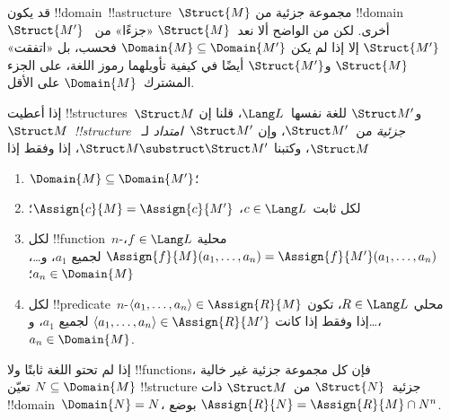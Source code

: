 \documentclass[../../../include/open-logic-section]{subfiles}
\begin{document}

قد يكون !!{domain}~!!a{structure}~$\Struct{M}$ مجموعة جزئية من
!!{domain}~$\Struct{M'}$ أخرى. لكن من الواضح ألا نعد~$\Struct{M}$
«جزءًا» من~$\Struct{M'}$ إلا إذا لم يكن $\Domain{M} \subseteq
\Domain{M'}$ فحسب، بل «اتفقت» $\Struct{M}$ و$\Struct{M'}$ أيضًا في
كيفية تأويلهما رموز اللغة، على الجزء المشترك~$\Domain{M}$ على الأقل.

\begin{defn}
إذا أعطيت !!{structure}s~$\Struct M$ و$\Struct M'$ للغة نفسها~$\Lang
L$، قلنا إن $\Struct M$~\emph{!!{structure} جزئية} من~$\Struct M'$،
وإن $\Struct M'$~\emph{امتداد} لـ~$\Struct M$، وكتبنا $\Struct M
\substruct \Struct M'$، إذا وفقط إذا
\begin{enumerate}
\item $\Domain{M} \subseteq \Domain{M'}$؛
\item لكل ثابت~$c \in \Lang L$، $\Assign{c}{M} =
    \Assign{c}{M'}$؛
\item لكل !!{function}~$n$-محلية $f \in \Lang L$،
  $\Assign{f}{M}(a_1, \dots, a_n) = \Assign{f}{M'}(a_1, \dots, a_n)$
  لجميع $a_1$، و\dots، $a_n \in \Domain{M}$؛
\item لكل !!{predicate}~$n$-محلي $R \in \Lang L$، تكون $\langle
  a_1, \dots, a_n\rangle \in \Assign{R}{M}$ إذا وفقط إذا كانت
  $\langle a_1, \dots, a_n\rangle \in \Assign{R}{M'}$ لجميع $a_1$،
  و\dots، $a_n \in \Domain{M}$.
\end{enumerate}
\end{defn}

\begin{rem}
إذا لم تحتو اللغة ثابتًا ولا !!{function}s، فإن كل مجموعة جزئية غير
خالية $N \subseteq \Domain{M}$ تعيّن !!{structure} جزئية~$\Struct{N}$
من~$\Struct M$ ذات !!{domain}~$\Domain{N} = N$، بوضع
$\Assign{R}{N} = \Assign{R}{M} \cap N^n$.
\end{rem}

\end{document}
